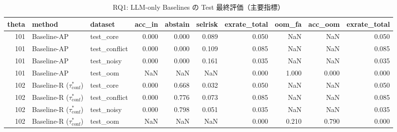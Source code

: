 \begin{table}[t]
\centering
\begin{tabular}{rllrrrrrrr}
\toprule
theta & method & dataset & acc_in & abstain & selrisk & exrate_total & oom_fa & acc_oom & exrate_total \\
\midrule
101 & Baseline-AP & test_core & 0.000 & 0.000 & 0.089 & 0.050 & NaN & NaN & 0.050 \\
101 & Baseline-AP & test_conflict & 0.000 & 0.000 & 0.109 & 0.085 & NaN & NaN & 0.085 \\
101 & Baseline-AP & test_noisy & 0.000 & 0.000 & 0.161 & 0.035 & NaN & NaN & 0.035 \\
101 & Baseline-AP & test_oom & NaN & NaN & NaN & 0.000 & 1.000 & 0.000 & 0.000 \\
102 & Baseline-R ($\tau_{\mathrm{conf}}^\ast$) & test_core & 0.000 & 0.668 & 0.032 & 0.050 & NaN & NaN & 0.050 \\
102 & Baseline-R ($\tau_{\mathrm{conf}}^\ast$) & test_conflict & 0.000 & 0.776 & 0.073 & 0.085 & NaN & NaN & 0.085 \\
102 & Baseline-R ($\tau_{\mathrm{conf}}^\ast$) & test_noisy & 0.000 & 0.798 & 0.051 & 0.035 & NaN & NaN & 0.035 \\
102 & Baseline-R ($\tau_{\mathrm{conf}}^\ast$) & test_oom & NaN & NaN & NaN & 0.000 & 0.210 & 0.790 & 0.000 \\
\bottomrule
\end{tabular}

\caption{RQ1: LLM-only Baselines の Test 最終評価（主要指標）}
\label{tab:rq1_test_overall}
\end{table}
